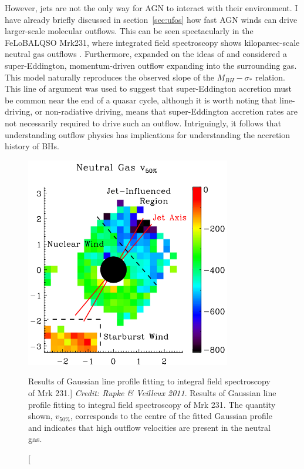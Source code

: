 However, jets are not the only way for AGN to interact with 
their environment. I have already briefly discussed in section~\ref{sec:ufos}
how fast AGN winds can drive larger-scale molecular outflows.
This can be seen spectacularly in the FeLoBALQSO Mrk231, 
where integrated field spectroscopy shows kiloparsec-scale
neutral gas outflows \citep[see Fig.~\ref{fig:rupke};][]{rupke2011}.
Furthermore, \cite{king2003} expanded on the ideas of \cite{silkrees1998} and
considered a super-Eddington, momentum-driven outflow expanding into the surrounding gas. 
This model naturally reproduces the observed slope of the $M_{BH}-\sigma_*$
relation. This line of argument was used to suggest that super-Eddington accretion must be
common near the end of a quasar cycle, although it is worth noting that line-driving,
or non-radiative driving, means that super-Eddington accretion rates are 
not necessarily required to drive such an outflow. Intriguingly, it follows that 
understanding outflow physics has implications for understanding 
the accretion history of BHs.

\begin{figure}
\centering
\includegraphics[width=0.8\textwidth]{figures/02-outflows/rupke2.png}
\caption
[Results of Gaussian line profile fitting to 
integral field spectroscopy of Mrk 231.]
{
{\sl Credit: Rupke \& Veilleux 2011}. 
Results of Gaussian line profile fitting to 
integral field spectroscopy of Mrk 231. The quantity
shown, $v_{50\%}$, corresponds to the centre of the fitted Gaussian
profile and indicates that high outflow velocities 
are present in the neutral gas.
} 
\label{fig:rupke}
\end{figure}


